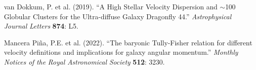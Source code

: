 \documentclass[twocolumn,prd,amsmath,amssymb,aps,superscriptaddress,nofootinbib]{revtex4-2}
\begin{document}
\begin{thebibliography}{99}
 van Dokkum, P. et al. (2019). ``A High Stellar Velocity Dispersion and $\sim$100 Globular Clusters for the Ultra-diffuse Galaxy Dragonfly 44.'' \textit{Astrophysical Journal Letters} \textbf{874}: L5.

 Mancera Piña, P.E. et al. (2022). ``The baryonic Tully-Fisher relation for different velocity definitions and implications for galaxy angular momentum.'' \textit{Monthly Notices of the Royal Astronomical Society} \textbf{512}: 3230.
\end{thebibliography}
\end{document}
